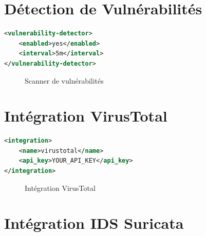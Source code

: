 \documentclass[12pt,a4paper]{article}
\begin{document}
\section{Détection de Vulnérabilités}

\begin{lstlisting}[language=xml]
<vulnerability-detector>
    <enabled>yes</enabled>
    <interval>5m</interval>
</vulnerability-detector>
\end{lstlisting}

\begin{figure}[H]
    \centering
    \caption{Scanner de vulnérabilités}
    \label{fig:vuln-scanner}
\end{figure}

\section{Intégration VirusTotal}

\begin{lstlisting}[language=xml]
<integration>
    <name>virustotal</name>
    <api_key>YOUR_API_KEY</api_key>
</integration>
\end{lstlisting}

\begin{figure}[H]
    \centering
    \caption{Intégration VirusTotal}
    \label{fig:virustotal}
\end{figure}

\section{Intégration IDS Suricata}
\end{document}
